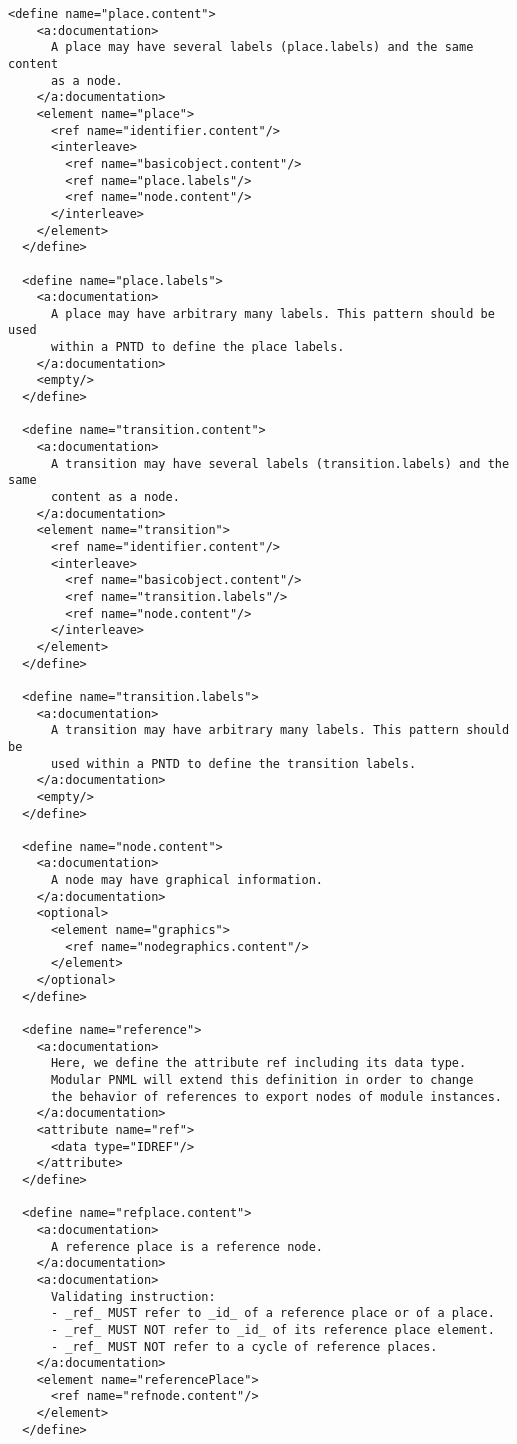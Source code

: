 \begin{lstlisting}[label=grammar_core,caption=RELAX NG implementation of PNML Core Model]
  <define name="place.content">
    <a:documentation>
      A place may have several labels (place.labels) and the same content 
      as a node.
    </a:documentation>
    <element name="place">
      <ref name="identifier.content"/>
      <interleave>
        <ref name="basicobject.content"/>
        <ref name="place.labels"/>
        <ref name="node.content"/>
      </interleave>
    </element>
  </define>

  <define name="place.labels">
    <a:documentation>
      A place may have arbitrary many labels. This pattern should be used
      within a PNTD to define the place labels.
    </a:documentation>
    <empty/>
  </define>

  <define name="transition.content">
    <a:documentation>
      A transition may have several labels (transition.labels) and the same 
      content as a node.
    </a:documentation>
    <element name="transition">
      <ref name="identifier.content"/>    
      <interleave>
        <ref name="basicobject.content"/>
        <ref name="transition.labels"/>
        <ref name="node.content"/>
      </interleave>
    </element>
  </define>

  <define name="transition.labels">
    <a:documentation>
      A transition may have arbitrary many labels. This pattern should be 
      used within a PNTD to define the transition labels.
    </a:documentation>
    <empty/>
  </define>

  <define name="node.content">
    <a:documentation>
      A node may have graphical information.
    </a:documentation>    
    <optional>
      <element name="graphics">
        <ref name="nodegraphics.content"/>
      </element>
    </optional>  
  </define>

  <define name="reference">
    <a:documentation>
      Here, we define the attribute ref including its data type.
      Modular PNML will extend this definition in order to change
      the behavior of references to export nodes of module instances.
    </a:documentation>
    <attribute name="ref">
      <data type="IDREF"/>
    </attribute>
  </define>

  <define name="refplace.content">
    <a:documentation>
      A reference place is a reference node.
    </a:documentation>
    <a:documentation>
      Validating instruction: 
      - _ref_ MUST refer to _id_ of a reference place or of a place.
      - _ref_ MUST NOT refer to _id_ of its reference place element.
      - _ref_ MUST NOT refer to a cycle of reference places.
    </a:documentation>
    <element name="referencePlace">
      <ref name="refnode.content"/>
    </element>
  </define>


\end{lstlisting}

